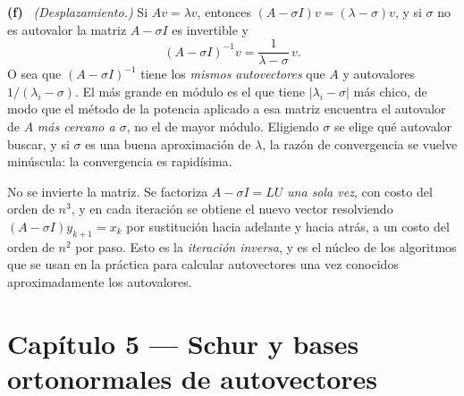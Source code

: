 \documentclass[11pt,a4paper]{article}
\newcommand{\bi}[1]{\boldsymbol{#1}}
\newcommand{\n}[1]{\boldsymbol{#1}}
\DeclareMathOperator{\gen}{span}
\DeclareMathOperator{\tr}{tr}
\DeclareMathOperator{\rg}{rg}
\def\n#1{#1}\def\bi#1{#1}\def\rg{rg}\def\tr{tr}\def\gen{span}%
\newcounter{entrega}[section]
\newcommand{\itemsol}[1]{\par\medskip\noindent\textbf{(#1)}\ \ignorespaces}
\begin{document}
\itemsol{f} \emph{(Desplazamiento.)} Si $A\n v=\lambda\n v$, entonces
$(A-\sigma I)\n v=(\lambda-\sigma)\n v$, y si $\sigma$ no es autovalor la matriz
$A-\sigma I$ es invertible y
\[
(A-\sigma I)^{-1}\n v=\frac{1}{\lambda-\sigma}\,\n v .
\]
O sea que $(A-\sigma I)^{-1}$ tiene los \emph{mismos autovectores} que $A$ y
autovalores $1/(\lambda_i-\sigma)$. El más grande en módulo es el que tiene
$|\lambda_i-\sigma|$ más chico, de modo que el método de la potencia aplicado a
esa matriz encuentra el autovalor de $A$ \emph{más cercano a $\sigma$}, no el de
mayor módulo. Eligiendo $\sigma$ se elige qué autovalor buscar, y si $\sigma$ es
una buena aproximación de $\lambda$, la razón de convergencia se vuelve
minúscula: la convergencia es rapidísima.

No se invierte la matriz. Se factoriza $A-\sigma I=LU$ \emph{una sola vez}, con
costo del orden de $n^3$, y en cada iteración se obtiene el nuevo vector
resolviendo $(A-\sigma I)\n y_{k+1}=\n x_k$ por sustitución hacia adelante y
hacia atrás, a un costo del orden de $n^2$ por paso. Esto es la \emph{iteración
inversa}, y es el núcleo de los algoritmos que se usan en la práctica para
calcular autovectores una vez conocidos aproximadamente los autovalores.


\clearpage
\section{Capítulo 5 --- Schur y bases ortonormales de autovectores}
\setcounter{entrega}{0}
\end{document}
